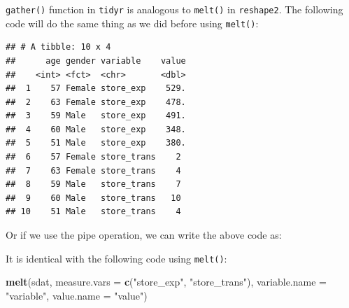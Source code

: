 \documentclass[12pt,]{krantz}
\makeatletter
\newenvironment{Shaded}{\begin{snugshade}}{\end{snugshade}}
\newcommand{\DataTypeTok}[1]{\textcolor[rgb]{0.27,0.27,0.27}{#1}}
\newcommand{\KeywordTok}[1]{\textcolor[rgb]{0.27,0.27,0.27}{\textbf{#1}}}
\newcommand{\NormalTok}[1]{#1}
\newcommand{\OperatorTok}[1]{\textcolor[rgb]{0.43,0.43,0.43}{\textbf{#1}}}
\newcommand{\StringTok}[1]{\textcolor[rgb]{0.5,0.5,0.5}{#1}}
\newenvironment{kframe}{%
\medskip{}
\setlength{\fboxsep}{.8em}
 \def\at@end@of@kframe{}%
 \ifinner\ifhmode%
  \def\at@end@of@kframe{\end{minipage}}%
  \begin{minipage}{\columnwidth}%
 \fi\fi%
 \def\FrameCommand##1{\hskip\@totalleftmargin \hskip-\fboxsep
 \colorbox{shadecolor}{##1}\hskip-\fboxsep
     \hskip-\linewidth \hskip-\@totalleftmargin \hskip\columnwidth}%
 \MakeFramed {\advance\hsize-\width
   \@totalleftmargin\z@ \linewidth\hsize
   \@setminipage}}%
 {\par\unskip\endMakeFramed%
 \at@end@of@kframe}
\renewenvironment{Shaded}{\begin{kframe}}{\end{kframe}}
\makeatother
\begin{document}
\texttt{gather()} function in \texttt{tidyr} is analogous to \texttt{melt()} in \texttt{reshape2}. The following code will do the same thing as we did before using \texttt{melt()}:

\begin{Shaded}
\end{Shaded}

\begin{verbatim}
## # A tibble: 10 x 4
##      age gender variable    value
##    <int> <fct>  <chr>       <dbl>
##  1    57 Female store_exp    529.
##  2    63 Female store_exp    478.
##  3    59 Male   store_exp    491.
##  4    60 Male   store_exp    348.
##  5    51 Male   store_exp    380.
##  6    57 Female store_trans    2 
##  7    63 Female store_trans    4 
##  8    59 Male   store_trans    7 
##  9    60 Male   store_trans   10 
## 10    51 Male   store_trans    4
\end{verbatim}

Or if we use the pipe operation, we can write the above code as:

\begin{Shaded}
\end{Shaded}

It is identical with the following code using \texttt{melt()}:

\begin{Shaded}
\begin{Highlighting}[]
\KeywordTok{melt}\NormalTok{(sdat, }\DataTypeTok{measure.vars =} \KeywordTok{c}\NormalTok{(}\StringTok{"store_exp"}\NormalTok{, }\StringTok{"store_trans"}\NormalTok{), }
     \DataTypeTok{variable.name =} \StringTok{"variable"}\NormalTok{, }
     \DataTypeTok{value.name =} \StringTok{"value"}\NormalTok{)}
\end{Highlighting}
\end{Shaded}
\end{document}
